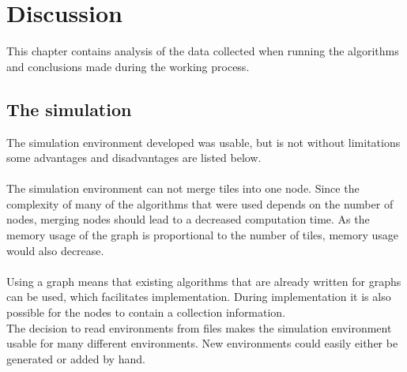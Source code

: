 \chapter{Discussion}
This chapter contains analysis of the data collected when running the algorithms and conclusions made during the working process.

\section{The simulation}
The simulation environment developed was usable, but is not without limitations some advantages and disadvantages are listed below.\\\\
The simulation environment can not merge tiles into one node. Since the complexity of many of the algorithms that were used depends on the number of nodes, merging nodes should lead to a decreased computation time. As the memory usage of the graph is proportional to the number of tiles, memory usage would also decrease.\\\\
Using a graph means that existing algorithms that are already written for graphs %
can be used, which facilitates implementation. During implementation it is also possible for the nodes to contain a collection information.\\
The decision to read environments from files makes the simulation environment usable for many different environments. New environments could easily either be generated or added by hand.
